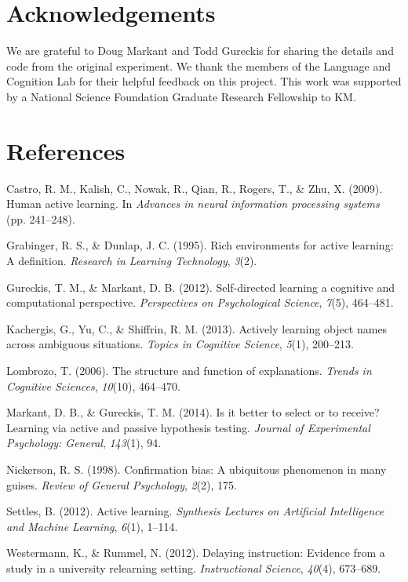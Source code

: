 \documentclass[10pt, letterpaper]{article}
\begin{document}
\section{Acknowledgements}\label{acknowledgements}

We are grateful to Doug Markant and Todd Gureckis for sharing the
details and code from the original experiment. We thank the members of
the Language and Cognition Lab for their helpful feedback on this
project. This work was supported by a National Science Foundation
Graduate Research Fellowship to KM.

\section{References}\label{references}

\setlength{\parindent}{-0.1in} \setlength{\leftskip}{0.125in} \noindent

Castro, R. M., Kalish, C., Nowak, R., Qian, R., Rogers, T., \& Zhu, X.
(2009). Human active learning. In \emph{Advances in neural information
processing systems} (pp. 241--248).

Grabinger, R. S., \& Dunlap, J. C. (1995). Rich environments for active
learning: A definition. \emph{Research in Learning Technology},
\emph{3}(2).

Gureckis, T. M., \& Markant, D. B. (2012). Self-directed learning a
cognitive and computational perspective. \emph{Perspectives on
Psychological Science}, \emph{7}(5), 464--481.

Kachergis, G., Yu, C., \& Shiffrin, R. M. (2013). Actively learning
object names across ambiguous situations. \emph{Topics in Cognitive
Science}, \emph{5}(1), 200--213.

Lombrozo, T. (2006). The structure and function of explanations.
\emph{Trends in Cognitive Sciences}, \emph{10}(10), 464--470.

Markant, D. B., \& Gureckis, T. M. (2014). Is it better to select or to
receive? Learning via active and passive hypothesis testing.
\emph{Journal of Experimental Psychology: General}, \emph{143}(1), 94.

Nickerson, R. S. (1998). Confirmation bias: A ubiquitous phenomenon in
many guises. \emph{Review of General Psychology}, \emph{2}(2), 175.

Settles, B. (2012). Active learning. \emph{Synthesis Lectures on
Artificial Intelligence and Machine Learning}, \emph{6}(1), 1--114.

Westermann, K., \& Rummel, N. (2012). Delaying instruction: Evidence
from a study in a university relearning setting. \emph{Instructional
Science}, \emph{40}(4), 673--689.
\end{document}
